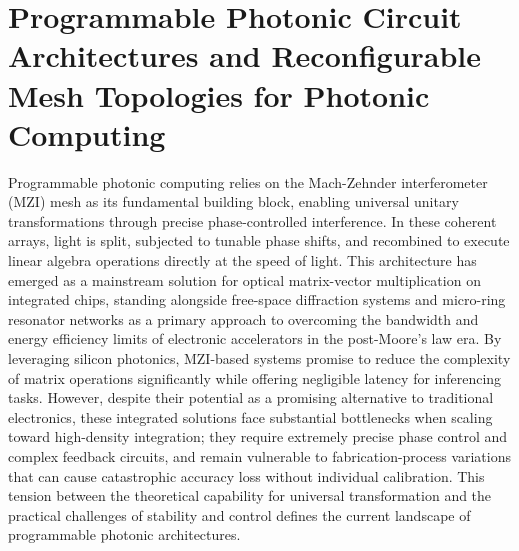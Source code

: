 \section{Programmable Photonic Circuit Architectures and Reconfigurable Mesh Topologies for Photonic Computing}\label{programmable-photonic-circuit-architectures-and-reconfigurable-mesh-topologies-for-photonic-computing}

Programmable photonic computing relies on the Mach-Zehnder interferometer (MZI) mesh as its fundamental building block, enabling universal unitary transformations through precise phase-controlled interference. \citep{doi_10_48550_arxiv_2407_03235_fe345c4b} \citep{doi_10_1063_5_0235712_fb28986d} In these coherent arrays, light is split, subjected to tunable phase shifts, and recombined to execute linear algebra operations directly at the speed of light. This architecture has emerged as a mainstream solution for optical matrix-vector multiplication on integrated chips, standing alongside free-space diffraction systems and micro-ring resonator networks as a primary approach to overcoming the bandwidth and energy efficiency limits of electronic accelerators in the post-Moore's law era. By leveraging silicon photonics, MZI-based systems promise to reduce the complexity of matrix operations significantly while offering negligible latency for inferencing tasks. However, despite their potential as a promising alternative to traditional electronics, these integrated solutions face substantial bottlenecks when scaling toward high-density integration; they require extremely precise phase control and complex feedback circuits, and remain vulnerable to fabrication-process variations that can cause catastrophic accuracy loss without individual calibration. This tension between the theoretical capability for universal transformation and the practical challenges of stability and control defines the current landscape of programmable photonic architectures. \citep{doi_10_1109_tnano_2022_3223915_d4da3e6b} \citep{doi_10_1088_1402_4896_ae8345_3b948559}

